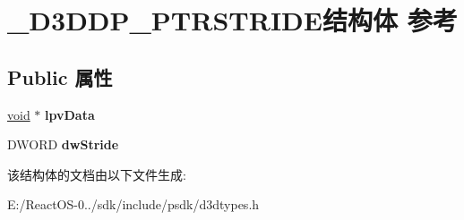 \hypertarget{struct___d3_d_d_p___p_t_r_s_t_r_i_d_e}{}\section{\+\_\+\+D3\+D\+D\+P\+\_\+\+P\+T\+R\+S\+T\+R\+I\+D\+E结构体 参考}
\label{struct___d3_d_d_p___p_t_r_s_t_r_i_d_e}
\subsection*{Public 属性}
\begin{DoxyCompactItemize}
\item 
\mbox{\label{struct___d3_d_d_p___p_t_r_s_t_r_i_d_e_a72a5c5023d905dfdf30149a2313085af}} 
\hyperlink{interfacevoid}{void} $\ast$ {\bfseries lpv\+Data}
\item 
\mbox{\label{struct___d3_d_d_p___p_t_r_s_t_r_i_d_e_a71f2b44c07ba7de93678986c4cf94fac}} 
D\+W\+O\+RD {\bfseries dw\+Stride}
\end{DoxyCompactItemize}


该结构体的文档由以下文件生成\+:\begin{DoxyCompactItemize}
\item 
E\+:/\+React\+O\+S-\/0../sdk/include/psdk/d3dtypes.\+h\end{DoxyCompactItemize}
